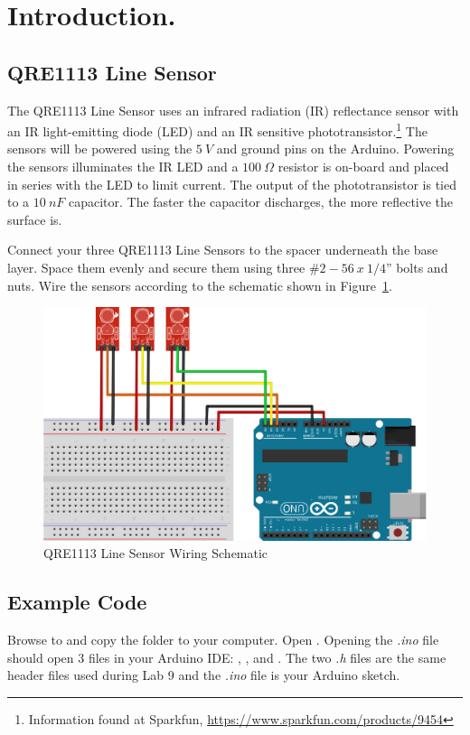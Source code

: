 \documentclass{handout}
\begin{document}
	\newpage
	\clearpage
	\pagebreak
	
	\section{Introduction.}
	
	\subsection{QRE1113 Line Sensor}
	The QRE1113 Line Sensor uses an infrared radiation (IR) reflectance sensor with an IR light-emitting diode (LED) and an IR sensitive phototransistor.\footnote{Information found at Sparkfun, \url{https://www.sparkfun.com/products/9454}} The sensors will be powered using the $5\ V$ and ground pins on the Arduino. Powering the sensors illuminates the IR LED and a $100\ \Omega$ resistor is on-board and placed in series with the LED to limit current. The output of the phototransistor is tied to a $10\ nF$ capacitor. The faster the capacitor discharges, the more reflective the surface is.\footnotemark[1]
	
	Connect your three QRE1113 Line Sensors to the spacer underneath the base layer. Space them evenly and secure them using three $\#2-56\ x\ 1/4”$ bolts and nuts. Wire the sensors according to the schematic shown in Figure~\ref{Fig Line}.
	
	\begin{figure} [H]
		\centering
		\includegraphics[width=.75\textwidth]{linefollowing.eps}
		\caption{QRE1113 Line Sensor Wiring Schematic}
		\label{Fig Line}
	\end{figure}
	
	\subsection{Example Code}
	Browse to  and copy the  folder to your computer. Open . Opening the \textit{.ino} file should open 3 files in your Arduino IDE: , , and . The two \textit{.h} files are the same header files used during Lab 9 and the \textit{.ino} file is your Arduino sketch.
	
\end{document}
